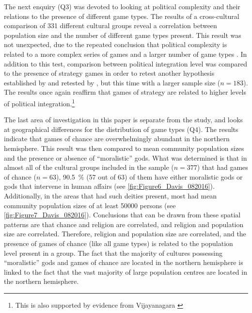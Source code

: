 \documentclass[%
	]{ijsra}
\begin{document}
The next enquiry (Q3) was devoted to looking at political complexity and their relations to the presence of different game types. The results of a cross-cultural comparison of 331 different cultural groups reveal a correlation between population size and the number of different game types present. This result was not unexpected, due to the repeated conclusion that political complexity is related to a more complex series of games and a larger number of game types \parencites[291]{ball1972}[322]{chick1984}[195]{chick1998}{chick2015}{peregrine2008}{roberts1959}. In addition to this test, comparison between political integration level was compared to the presence of strategy games in order to retest another hypothesis established by \textcite{roberts1959} and retested by \textcite{chick1998}, but this time with a larger sample size ($n = 183$). The results once again reaffirm that games of strategy are related to higher levels of political integration.\footnote{This is also supported by evidence from Vijayanagara \parencite{rogersdotter2015}}

The last area of investigation in this paper is separate from the \textcite{roberts1959} study, and looks at geographical differences for the distribution of game types (Q4). The results indicate that games of chance are overwhelmingly abundant in the northern hemisphere. This result was then compared to mean community population sizes and the presence or absence of ``moralistic” gods. What was determined is that in almost all of the cultural groups included in the sample ($n = 377$) that had games of chance ($n = 63$), \SI{90.5}{\percent} (57 out of 63) of them have either moralistic gods or gods that intervene in human affairs (see \cref{fig:Figure6_Davis_082016}). Additionally, in the areas that had such deities present, most had mean community population sizes of at least \num{50000} persons (see \cref{fig:Figure7_Davis_082016}). 
Conclusions that can be drawn from these spatial patterns are that chance and religion are correlated, and religion and population size are correlated. Therefore, religion and population size are correlated, and the presence of games of chance (like all game types) is related to the population level present in a group. 
The fact that the majority of cultures possessing ``moralistic” gods and games of chance are located in the northern hemisphere is linked to the fact that the vast majority of large population centres are located in the northern hemisphere.
\end{document}
